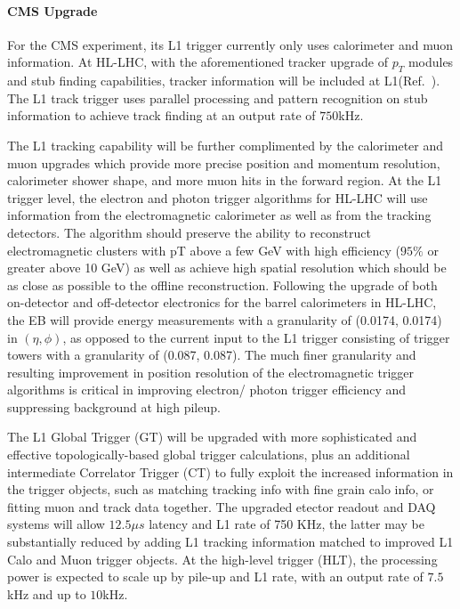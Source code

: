 \paragraph{CMS Upgrade} 
For the CMS experiment, its L1 trigger currently only uses calorimeter and muon information. 
At HL-LHC, with the aforementioned tracker upgrade of $p_T$ modules and stub finding capabilities, tracker information will be included at L1(Ref.~\cite{Lourenco:2283192}). 
The L1 track trigger uses parallel processing and pattern recognition on stub information to achieve track finding at an output rate of $750$kHz. 

The L1 tracking capability will be further complimented by the calorimeter and muon upgrades which provide more precise position and momentum resolution, calorimeter shower shape, and more muon hits in the forward region.
At the L1 trigger level, the electron and photon trigger algorithms for HL-LHC will use information from the electromagnetic calorimeter as well as from the tracking detectors.
The algorithm should preserve the ability to reconstruct electromagnetic clusters with pT above a few GeV with high efficiency ($95\%$ or
greater above 10 GeV) as well as achieve high spatial resolution which should be as close as possible to the offline reconstruction.
Following the upgrade of both on-detector and off-detector electronics for the barrel calorimeters
in HL-LHC, the EB will provide energy measurements with a granularity of (0.0174, 0.0174)
in $(\eta, \phi)$, as opposed to the current input to the L1 trigger consisting of trigger towers
with a granularity of (0.087, 0.087). The much finer granularity and resulting improvement in position resolution of the electromagnetic trigger algorithms is critical in improving electron/
photon trigger efficiency and suppressing background at high pileup.

The L1 Global Trigger (GT) will be upgraded with more sophisticated and effective topologically-based global trigger calculations,
plus an additional intermediate Correlator Trigger (CT) to fully exploit the increased information in the trigger objects, such as matching tracking info with fine grain calo info, or fitting muon and track data together.
The upgraded etector readout and DAQ systems will allow $12.5 \mu s$ latency and L1 rate of 750 KHz, the latter may be substantially reduced by adding L1 tracking information matched to improved L1 Calo and Muon trigger objects.
At the high-level trigger (HLT), the processing power is expected to scale up by pile-up and L1 rate, with an output rate of $7.5$kHz and up to $10$kHz. 

